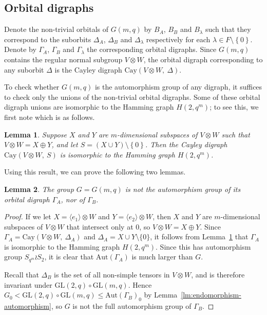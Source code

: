 \documentclass[10pt]{amsart}
\theoremstyle{definition}
\theoremstyle{plain}
\newtheorem{lemma}[lemma]{Lemma}
\theoremstyle{plain}
\theoremstyle{plain}
\theoremstyle{plain}
\newcommand{\Aut}{\mathrm{Aut}}
\newcommand{\Cay}{\mathrm{Cay}}
\newcommand{\GL}{\mathrm{GL}}
\begin{document}
\subsection{Orbital digraphs}

Denote the non-trivial orbitals of $G{\left(m, q \right)}$ by $B_A$, $B_B$ and $B_\lambda$ such that they correspond to the suborbits $\Delta_A$, $\Delta_B$ and $\Delta_\lambda$ respectively for each $\lambda \in F \setminus \left\{0 \right\}$. Denote by $\Gamma_A$, $\Gamma_B$ and $\Gamma_\lambda$ the corresponding orbital digraphs. Since $G{\left(m, q \right)}$ contains the regular normal subgroup $V \otimes W$, the orbital digraph corresponding to any suborbit $\Delta$ is the Cayley digraph $\Cay{\left(V \otimes W,\ \Delta \right)}$.

To check whether $G{\left(m, q \right)}$ is the automorphism group of any digraph, it suffices to check only the unions of the non-trivial orbital digraphs. Some of these orbital digraph unions are isomorphic to the Hamming graph $H{\left(2, q^m \right)}$; to see this, we first note \cite[Lemma 3.1]{ref:giudici-primitive} which is as follows.

\begin{lemma} \label{lm:direct-sum-hamming}
Suppose $X$ and $Y$ are $m$-dimensional subspaces of $V \otimes W$ such that $V \otimes W = X \oplus Y$, and let $S = \left(X \cup Y \right) \setminus \left\{0 \right\}$. Then the Cayley digraph $\Cay{\left(V \otimes W,\ S \right)}$ is isomorphic to the Hamming graph $H{\left(2, q^m \right)}$.
\end{lemma}

Using this result, we can prove the following two lemmas.

\begin{lemma} \label{lm:Gamma_A,B}
The group $G = G{\left(m, q \right)}$ is not the automorphism group of its orbital digraph $\Gamma_A$, nor of $\Gamma_B$.
\end{lemma}
\begin{proof}
If we let $X = \langle e_1 \rangle \otimes W$ and $Y = \langle e_2 \rangle \otimes W$, then $X$ and $Y$ are $m$-dimensional subspaces of $V \otimes W$ that intersect only at $0$, so $V \otimes W = X \oplus Y$. Since $\Gamma_A = \Cay{\left(V \otimes W,\ \Delta_A \right)}$ and $\Delta_A = X \cup Y \setminus \{0\}$, it follows from Lemma~\ref{lm:direct-sum-hamming} that $\Gamma_A$ is isomorphic to the Hamming graph $H{\left(2, q^m \right)}$. Since this has automorphism group $S_{q^m} \wr S_2$, it is clear that $\Aut{\left(\Gamma_A \right)}$ is much larger than $G$.

Recall that $\Delta_B$ is the set of all non-simple tensors in $V \otimes W$, and is therefore invariant under $\GL{\left(2, q \right)} \circ \GL{\left(m, q \right)}$. Hence $G_0 < \GL{\left(2, q \right)} \circ \GL{\left(m, q \right)} \leqslant \Aut{\left(\Gamma_B \right)}_0$ by Lemma~\ref{lm:endomorphism-automorphism}, so $G$ is not the full automorphism group of $\Gamma_B$.
\end{proof}
\end{document}

